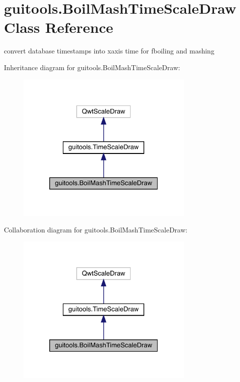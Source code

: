 \hypertarget{classguitools_1_1_boil_mash_time_scale_draw}{}\section{guitools.\+Boil\+Mash\+Time\+Scale\+Draw Class Reference}
\label{classguitools_1_1_boil_mash_time_scale_draw}


convert database timestamps into xaxis time for fboiling and mashing  




Inheritance diagram for guitools.\+Boil\+Mash\+Time\+Scale\+Draw\+:\nopagebreak
\begin{figure}[H]
\begin{center}
\leavevmode
\includegraphics[width=245pt]{classguitools_1_1_boil_mash_time_scale_draw__inherit__graph}
\end{center}
\end{figure}


Collaboration diagram for guitools.\+Boil\+Mash\+Time\+Scale\+Draw\+:\nopagebreak
\begin{figure}[H]
\begin{center}
\leavevmode
\includegraphics[width=245pt]{classguitools_1_1_boil_mash_time_scale_draw__coll__graph}
\end{center}
\end{figure}
